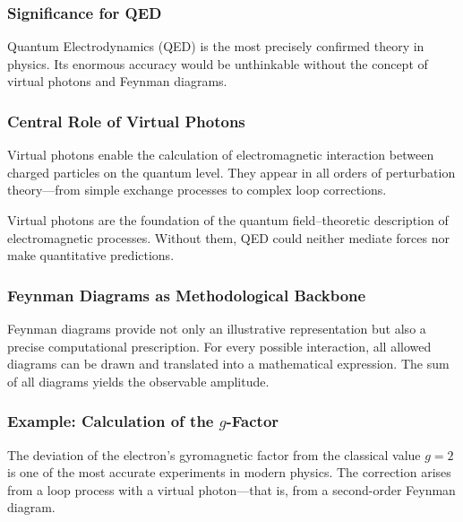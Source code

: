 \newpage
\noindent
\subsubsection{Significance for QED}

Quantum Electrodynamics (QED) is the most precisely confirmed theory in physics. Its enormous accuracy would be unthinkable without the concept of virtual photons and Feynman diagrams.
\subsubsection*{Central Role of Virtual Photons}
Virtual photons enable the calculation of electromagnetic interaction between charged particles on the quantum level. They appear in all orders of perturbation theory—from simple exchange processes to complex loop corrections.

\vspace{1em}
\begin{tcolorbox}[physikbox, title=No QED Without Virtual Photons]
	\label{box:Ohne virtuelle Photonen keine}
	Virtual photons are the foundation of the quantum field–theoretic description of electromagnetic processes. Without them, QED could neither mediate forces nor make quantitative predictions.
\end{tcolorbox}

\subsubsection*{Feynman Diagrams as Methodological Backbone}
Feynman diagrams provide not only an illustrative representation but also a precise computational prescription. For every possible interaction, all allowed diagrams can be drawn and translated into a mathematical expression. The sum of all diagrams yields the observable amplitude.

\subsubsection*{Example: Calculation of the $g$-Factor}
The deviation of the electron’s gyromagnetic factor from the classical value $g = 2$ is one of the most accurate experiments in modern physics. The correction arises from a loop process with a virtual photon—that is, from a second-order Feynman diagram.

